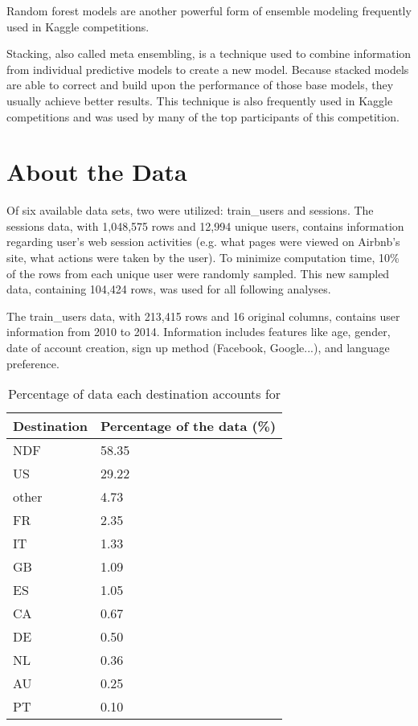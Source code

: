 \documentclass{article}
\begin{document}
Random forest models are another powerful form of ensemble modeling frequently used in Kaggle competitions. 

Stacking, also called meta ensembling, is a technique used to combine information from individual predictive models to create a new model. Because stacked models are able to correct and build upon the performance of those base models, they usually achieve better results. This technique is also frequently used in Kaggle competitions and was used by many of the top participants of this competition. 


\section{About the Data}

Of six available data sets, two were utilized: train\_users and sessions. The sessions data, with 1,048,575 rows and 12,994 unique users, contains information regarding user's web session activities (e.g. what pages were viewed on Airbnb's site, what actions were taken by the user). To minimize computation time, 10\% of the rows from each unique user were randomly sampled. This new sampled data, containing 104,424 rows, was used for all following analyses. 

The train\_users data, with 213,415 rows and 16 original columns, contains user information from 2010 to 2014. Information includes features like age, gender, date of account creation, sign up method (Facebook, Google...), and language preference. 

\begin{table}[ht]
\centering
\begin{tabular}{| l |l |}
  \hline
  \textbf{Destination} & \textbf{Percentage of the data (\%)} \\ 
  \hline
  NDF & 58.35 \\ 
  US & 29.22 \\ 
  other & 4.73 \\ 
  FR & 2.35 \\ 
  IT & 1.33 \\ 
  GB & 1.09 \\ 
  ES & 1.05 \\ 
  CA & 0.67 \\ 
  DE & 0.50 \\ 
  NL & 0.36 \\ 
  AU & 0.25 \\ 
  PT & 0.10 \\ 
   \hline
\end{tabular}
\caption{Percentage of data each destination accounts for}
\label{table:countries}
\end{table}
\end{document}
